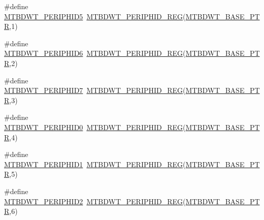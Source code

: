 \begin{DoxyCompactItemize}
\item 
\#define \hyperlink{group___m_t_b_d_w_t___register___accessor___macros_ga784ae33118477a2b68ce261e0caf4b85}{M\+T\+B\+D\+W\+T\+\_\+\+P\+E\+R\+I\+P\+H\+I\+D5}~\hyperlink{group___m_t_b_d_w_t___register___accessor___macros_ga91f7c6dfb35fc0d26fb6b3fae63757fc}{M\+T\+B\+D\+W\+T\+\_\+\+P\+E\+R\+I\+P\+H\+I\+D\+\_\+\+R\+EG}(\hyperlink{group___m_t_b_d_w_t___peripheral_ga97d048bfb5a11293a38c444b8347ff42}{M\+T\+B\+D\+W\+T\+\_\+\+B\+A\+S\+E\+\_\+\+P\+TR},1)
\item 
\#define \hyperlink{group___m_t_b_d_w_t___register___accessor___macros_gac164f79edd8679be62049881e3e01e68}{M\+T\+B\+D\+W\+T\+\_\+\+P\+E\+R\+I\+P\+H\+I\+D6}~\hyperlink{group___m_t_b_d_w_t___register___accessor___macros_ga91f7c6dfb35fc0d26fb6b3fae63757fc}{M\+T\+B\+D\+W\+T\+\_\+\+P\+E\+R\+I\+P\+H\+I\+D\+\_\+\+R\+EG}(\hyperlink{group___m_t_b_d_w_t___peripheral_ga97d048bfb5a11293a38c444b8347ff42}{M\+T\+B\+D\+W\+T\+\_\+\+B\+A\+S\+E\+\_\+\+P\+TR},2)
\item 
\#define \hyperlink{group___m_t_b_d_w_t___register___accessor___macros_ga6f2e5a20f256ee541d4adc833f8d00ed}{M\+T\+B\+D\+W\+T\+\_\+\+P\+E\+R\+I\+P\+H\+I\+D7}~\hyperlink{group___m_t_b_d_w_t___register___accessor___macros_ga91f7c6dfb35fc0d26fb6b3fae63757fc}{M\+T\+B\+D\+W\+T\+\_\+\+P\+E\+R\+I\+P\+H\+I\+D\+\_\+\+R\+EG}(\hyperlink{group___m_t_b_d_w_t___peripheral_ga97d048bfb5a11293a38c444b8347ff42}{M\+T\+B\+D\+W\+T\+\_\+\+B\+A\+S\+E\+\_\+\+P\+TR},3)
\item 
\#define \hyperlink{group___m_t_b_d_w_t___register___accessor___macros_ga07083686c100d0c9d3690d13bf1e6283}{M\+T\+B\+D\+W\+T\+\_\+\+P\+E\+R\+I\+P\+H\+I\+D0}~\hyperlink{group___m_t_b_d_w_t___register___accessor___macros_ga91f7c6dfb35fc0d26fb6b3fae63757fc}{M\+T\+B\+D\+W\+T\+\_\+\+P\+E\+R\+I\+P\+H\+I\+D\+\_\+\+R\+EG}(\hyperlink{group___m_t_b_d_w_t___peripheral_ga97d048bfb5a11293a38c444b8347ff42}{M\+T\+B\+D\+W\+T\+\_\+\+B\+A\+S\+E\+\_\+\+P\+TR},4)
\item 
\#define \hyperlink{group___m_t_b_d_w_t___register___accessor___macros_ga9e516a8106ad8dbb2c338a2727a6b309}{M\+T\+B\+D\+W\+T\+\_\+\+P\+E\+R\+I\+P\+H\+I\+D1}~\hyperlink{group___m_t_b_d_w_t___register___accessor___macros_ga91f7c6dfb35fc0d26fb6b3fae63757fc}{M\+T\+B\+D\+W\+T\+\_\+\+P\+E\+R\+I\+P\+H\+I\+D\+\_\+\+R\+EG}(\hyperlink{group___m_t_b_d_w_t___peripheral_ga97d048bfb5a11293a38c444b8347ff42}{M\+T\+B\+D\+W\+T\+\_\+\+B\+A\+S\+E\+\_\+\+P\+TR},5)
\item 
\#define \hyperlink{group___m_t_b_d_w_t___register___accessor___macros_ga823bbdb0a6008b9e4be7ff1646a8ec41}{M\+T\+B\+D\+W\+T\+\_\+\+P\+E\+R\+I\+P\+H\+I\+D2}~\hyperlink{group___m_t_b_d_w_t___register___accessor___macros_ga91f7c6dfb35fc0d26fb6b3fae63757fc}{M\+T\+B\+D\+W\+T\+\_\+\+P\+E\+R\+I\+P\+H\+I\+D\+\_\+\+R\+EG}(\hyperlink{group___m_t_b_d_w_t___peripheral_ga97d048bfb5a11293a38c444b8347ff42}{M\+T\+B\+D\+W\+T\+\_\+\+B\+A\+S\+E\+\_\+\+P\+TR},6)

\end{DoxyCompactItemize}
